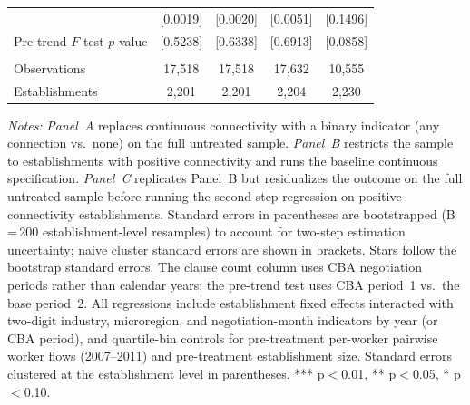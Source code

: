\documentclass[12pt,letterpaper]{article}
\begin{document}
\begin{table}[H]
\begin{threeparttable}
\begin{tabular}{lcccc}
  & [0.0019] & [0.0020] & [0.0051] & [0.1496] \\
Pre-trend $F$-test $p$-value & [0.5238] & [0.6338] & [0.6913] & [0.0858] \\
  &  &  &  & \\
Observations & 17{,}518 & 17{,}518 & 17{,}632 & 10{,}555 \\
Establishments & 2{,}201 & 2{,}201 & 2{,}204 & 2{,}230 \\
\bottomrule
\end{tabular}
\scriptsize
\begin{tablenotes}
\item \textit{Notes:} \textit{Panel~A} replaces continuous connectivity with a binary indicator (any connection vs.\ none) on the full untreated sample. \textit{Panel~B} restricts the sample to establishments with positive connectivity and runs the baseline continuous specification. \textit{Panel~C} replicates Panel~B but residualizes the outcome on the full untreated sample before running the second-step regression on positive-connectivity establishments. Standard errors in parentheses are bootstrapped (B\,=\,200 establishment-level resamples) to account for two-step estimation uncertainty; naive cluster standard errors are shown in brackets. Stars follow the bootstrap standard errors. The clause count column uses CBA negotiation periods rather than calendar years; the pre-trend test uses CBA period~1 vs.\ the base period~2. All regressions include establishment fixed effects interacted with two-digit industry, microregion, and negotiation-month indicators by year (or CBA period), and quartile-bin controls for pre-treatment per-worker pairwise worker flows (2007--2011) and pre-treatment establishment size. Standard errors clustered at the establishment level in parentheses. *** p$<$0.01, ** p$<$0.05, * p$<$0.10.
\end{tablenotes}
\end{threeparttable}
\end{table}

\clearpage
\end{document}
